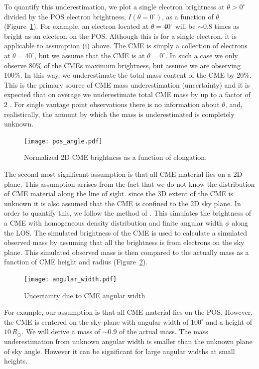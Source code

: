 To quantify this underestimation, we plot a single electron brightness at $\theta>0^{\circ}$ divided by the POS electron brightness, $I(\theta=0^{\circ})$, as a function of $\theta$ (Figure~\ref{fig:pos_angle}). For example, an electron located at $\theta=40^{\circ}$ will be $\sim$0.8 times as bright as an electron on the POS. Although this is for a single electron, it is applicable to assumption (i) above. The CME is simply a collection of electrons at $\theta=40^{\circ}$, but we assume that the CME is at $\theta=0^{\circ}$. In such a case we only observe 80\% of the CMEs maximum brightness, but assume we are observing 100\%. In this way, we underestimate the total mass content of the CME by 20\%. This is the primary source of CME mass underestimation (uncertainty) and it is expected that on average we underestimate total CME mass by up to a factor of 2 \citep{vou00}. For single vantage point observations there is no information about $\theta$, and, realistically, the amount by which the mass is underestimated is completely unknown.
\begin{figure}[!t]
\begin{center}
\texttt{[image: pos\_angle.pdf]}
\caption[Electron brightness as function of angle]{Normalized 2D CME brightness as a function of elongation.}
\label{fig:pos_angle}
\end{center}
\end{figure}
%
%
The second most significant assumption is that all CME material lies on a 2D plane. This assumption arrises from the fact that we do not know the distribution of CME material along the line of sight. since the 3D extent of the CME is unknown it is also assumed that the CME is confined to the 2D sky plane. In order to quantify this, we follow the method of \citep{vou00}. This simulates the brightness of a CME with homogeneous density distribution and finite angular width $\phi$ along the LOS. The simulated brightness of the CME is used to calculate a simulated observed mass by assuming that all the brightness is from electrons on the sky plane. This simulated observed mass is then compared to the actually mass as a function of CME height and radius (Figure~\ref{fig:ang_width_error}).
\begin{figure}[!t]
\begin{center}
\texttt{[image: angular\_width.pdf]}
\caption[Uncertainty due to CME angular width]{Uncertainty due to CME angular width}
\label{fig:ang_width_error}
\end{center}
\end{figure}
For example, our assumption is that all CME material lies on the POS. However, the CME is centered on the sky-plane with angular width of $100^{\circ}$ and a height of $10\,R_{\odot}$. We will derive a mass of $\sim$0.9 of the actual mass. The mass underestimation from unknown angular width is smaller than the unknown plane of sky angle. However it can be significant for large angular widths at small heights.

